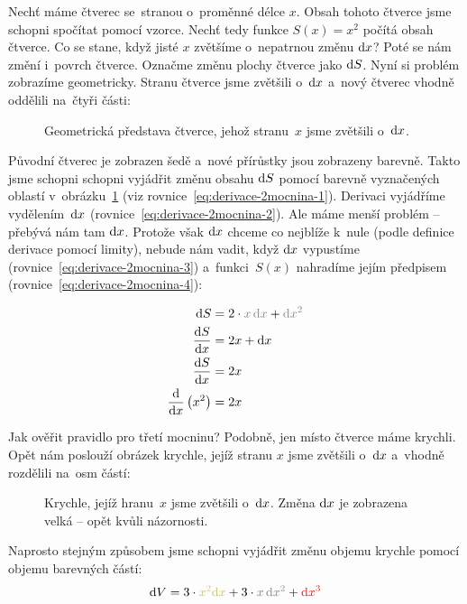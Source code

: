 Nechť máme čtverec se~stranou o~proměnné délce $x$. Obsah tohoto čtverce jsme schopni
spočítat pomocí vzorce. Nechť tedy funkce $S(x) = x^2$ počítá obsah čtverce. Co se
stane, když jisté $x$ zvětšíme o~nepatrnou změnu $\mathrm{d} x$? Poté se nám změní
i~povrch čtverce. Označme změnu plochy čtverce jako $\mathrm{d} S$. Nyní si problém
zobrazíme geometricky. Stranu čtverce jsme zvětšili o~$\mathrm{d} x$ a~nový čtverec
vhodně oddělili na~čtyři části:

\begin{figure}[h!]
    \centering
    
    \caption{Geometrická představa čtverce, jehož stranu~$x$ jsme zvětšili o~$\mathrm{d} x$.}
    \label{fig:derivace-rozdel-ctverec}
\end{figure}

Původní čtverec je zobrazen šedě a~nové přírůstky jsou zobrazeny barevně. Takto jsme
schopni schopni vyjádřit změnu obsahu $\mathrm{d} S$ pomocí barevně vyznačených
oblastí v~obrázku~\ref{fig:derivace-rozdel-ctverec} (viz rovnice~\ref{eq:derivace-2mocnina-1}).
Derivaci vyjádříme vydělením~$\mathrm{d} x$ (rovnice~\ref{eq:derivace-2mocnina-2}).
Ale máme menší problém -- přebývá nám tam $\mathrm{d} x$. Protože však $\mathrm{d} x$
chceme co nejblíže k~nule (podle definice derivace pomocí limity), nebude nám vadit,
když $\mathrm{d} x$ vypustíme (rovnice~\ref{eq:derivace-2mocnina-3}) a~funkci~$S(x)$
nahradíme jejím předpisem (rovnice~\ref{eq:derivace-2mocnina-4}):

\begin{subequations}
\begin{align}
    \diff{S} &= 2 \cdot {\color{accentColor} x \, \diff{x}} + {\color{accentColor!50!gray} \diff{x}^2}
    \label{eq:derivace-2mocnina-1} \\
    \fracdiff{S}{x} &= 2x + \diff{x}
    \label{eq:derivace-2mocnina-2} \\
    \fracdiff{S}{x} &= 2x
    \label{eq:derivace-2mocnina-3} \\
    \fracdiff{}{x} \left( x^2 \right) &= 2x
    \label{eq:derivace-2mocnina-4}
\end{align}
\end{subequations}

Jak ověřit pravidlo pro třetí mocninu? Podobně, jen místo čtverce máme krychli. Opět
nám poslouží obrázek krychle, jejíž stranu $x$ jsme zvětšili o~$\mathrm{d} x$ a~vhodně
rozdělili na~osm částí:

\begin{figure}[!ht]
    \centering
    
    \caption{Krychle, jejíž hranu~$x$ jsme zvětšili o~$\mathrm{d} x$. Změna $\mathrm{d} x$
    je zobrazena velká -- opět kvůli názornosti.}
    \label{fig:derivace-rozdel-krychle}
\end{figure}

Naprosto stejným způsobem jsme schopni vyjádřit změnu objemu krychle pomocí objemu
barevných částí:
\begin{equation*}
    \mathrm{d}V = 3 \cdot {\color{accentColor!50!yellow} x^2 \diff{x}}
        + 3 \cdot {\color{accentColor} x \, \diff{x}^2}
        + {\color{red} \diff{x}^3}
\end{equation*}
